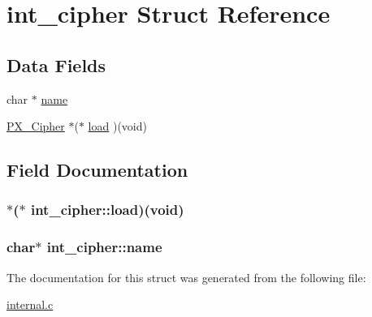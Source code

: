 \hypertarget{structint__cipher}{\section{int\-\_\-cipher Struct Reference}
\label{structint__cipher}
}
\subsection*{Data Fields}
\begin{DoxyCompactItemize}
\item 
char $\ast$ \hyperlink{structint__cipher_a4964144dbab1ea02b5ffe63335c0c3c1}{name}
\item 
\hyperlink{px_8h_a971b71d1dd84736bdccbc92805c3d018}{P\-X\-\_\-\-Cipher} $\ast$($\ast$ \hyperlink{structint__cipher_a30235bc76f5f13c478cb48db07fffe6e}{load} )(void)
\end{DoxyCompactItemize}


\subsection{Field Documentation}
\hypertarget{structint__cipher_a30235bc76f5f13c478cb48db07fffe6e}{
\subsubsection[{load}]{$\ast$($\ast$ int\-\_\-cipher\-::load)(void)}}\label{structint__cipher_a30235bc76f5f13c478cb48db07fffe6e}
\hypertarget{structint__cipher_a4964144dbab1ea02b5ffe63335c0c3c1}{
\subsubsection[{name}]{\setlength{\rightskip}{0pt plus 5cm}char$\ast$ int\-\_\-cipher\-::name}}\label{structint__cipher_a4964144dbab1ea02b5ffe63335c0c3c1}


The documentation for this struct was generated from the following file\-:\begin{DoxyCompactItemize}
\item 
\hyperlink{internal_8c}{internal.\-c}\end{DoxyCompactItemize}
